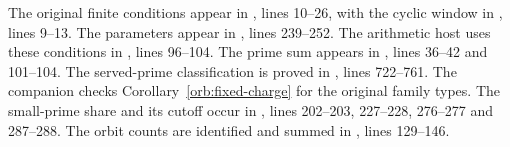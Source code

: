 The original finite conditions appear in , lines 10--26, with the cyclic
window in , lines 9--13. The parameters appear
in , lines
239--252. The arithmetic host uses these conditions in
, lines 96--104.
The prime sum appears in ,
lines 36--42 and 101--104. The served-prime classification is proved
in ,
lines 722--761. The companion 
checks Corollary~\ref{orb:fixed-charge} for the original family types.
The small-prime share and its cutoff occur in
, lines 202--203,
227--228, 276--277 and 287--288. The orbit counts are identified and summed in
, lines 129--146.
